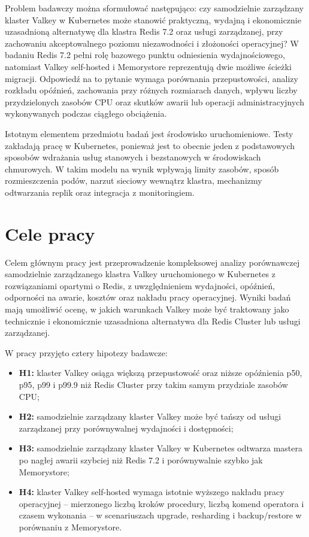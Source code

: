 Problem badawczy można sformułować następująco: czy samodzielnie zarządzany klaster Valkey w Kubernetes może stanowić praktyczną, wydajną i ekonomicznie uzasadnioną alternatywę dla klastra Redis 7.2 oraz usługi zarządzanej, przy zachowaniu akceptowalnego poziomu niezawodności i złożoności operacyjnej? W badaniu Redis 7.2 pełni rolę bazowego punktu odniesienia wydajnościowego, natomiast Valkey self-hosted i Memorystore reprezentują dwie możliwe ścieżki migracji. Odpowiedź na to pytanie wymaga porównania przepustowości, analizy rozkładu opóźnień, zachowania przy różnych rozmiarach danych, wpływu liczby przydzielonych zasobów CPU oraz skutków awarii lub operacji administracyjnych wykonywanych podczas ciągłego obciążenia.

Istotnym elementem przedmiotu badań jest środowisko uruchomieniowe. Testy zakładają pracę w Kubernetes, ponieważ jest to obecnie jeden z podstawowych sposobów wdrażania usług stanowych i bezstanowych w środowiskach chmurowych. W takim modelu na wynik wpływają limity zasobów, sposób rozmieszczenia podów, narzut sieciowy wewnątrz klastra, mechanizmy odtwarzania replik oraz integracja z monitoringiem.


\section{Cele pracy}

Celem głównym pracy jest przeprowadzenie kompleksowej analizy porównawczej samodzielnie zarządzanego klastra Valkey uruchomionego w Kubernetes z rozwiązaniami opartymi o Redis, z uwzględnieniem wydajności, opóźnień, odporności na awarie, kosztów oraz nakładu pracy operacyjnej. Wyniki badań mają umożliwić ocenę, w jakich warunkach Valkey może być traktowany jako technicznie i ekonomicznie uzasadniona alternatywa dla Redis Cluster lub usługi zarządzanej.

W pracy przyjęto cztery hipotezy badawcze:

\begin{itemize}
    \item \textbf{H1:} klaster Valkey osiąga większą przepustowość oraz niższe opóźnienia p50, p95, p99 i p99.9 niż Redis Cluster przy takim samym przydziale zasobów CPU;
    \item \textbf{H2:} samodzielnie zarządzany klaster Valkey może być tańszy od usługi zarządzanej przy porównywalnej wydajności i dostępności;
    \item \textbf{H3:} samodzielnie zarządzany klaster Valkey w Kubernetes odtwarza mastera po nagłej awarii szybciej niż Redis 7.2 i porównywalnie szybko jak Memorystore;
    \item \textbf{H4:} klaster Valkey self-hosted wymaga istotnie wyższego nakładu pracy operacyjnej -- mierzonego liczbą kroków procedury, liczbą komend operatora i czasem wykonania -- w scenariuszach upgrade, resharding i backup/restore w porównaniu z Memorystore.
\end{itemize}

